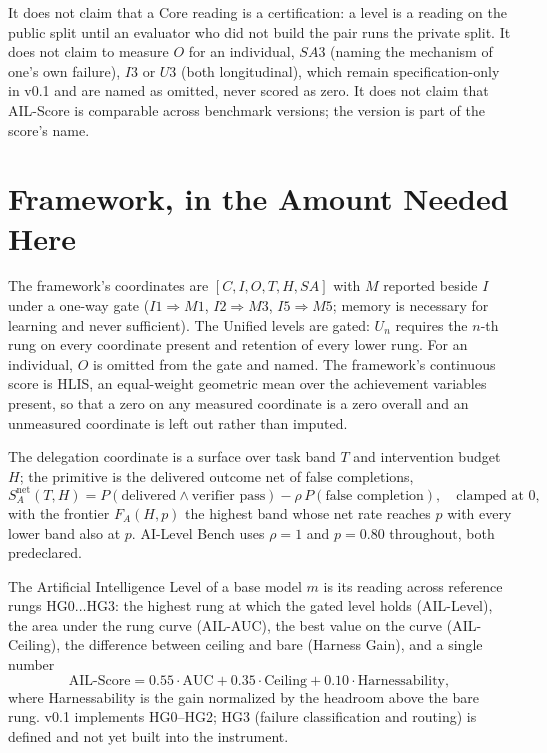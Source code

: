 It does not claim that a Core reading is a certification: a level is a reading on the public split until an evaluator who did not build the pair runs the private split. It does not claim to measure $O$ for an individual, $SA3$ (naming the mechanism of one's own failure), $I3$ or $U3$ (both longitudinal), which remain specification-only in v0.1 and are named as omitted, never scored as zero. It does not claim that AIL-Score is comparable across benchmark versions; the version is part of the score's name.

\section{Framework, in the Amount Needed Here}\label{sec:framework}

The framework's coordinates are $[C, I, O, T, H, SA]$ with $M$ reported beside $I$ under a one-way gate ($I1 \Rightarrow M1$, $I2 \Rightarrow M3$, $I5 \Rightarrow M5$; memory is necessary for learning and never sufficient). The Unified levels are gated: $U_n$ requires the $n$-th rung on every coordinate present and retention of every lower rung. For an individual, $O$ is omitted from the gate and named. The framework's continuous score is HLIS, an equal-weight geometric mean over the achievement variables present, so that a zero on any measured coordinate is a zero overall and an unmeasured coordinate is left out rather than imputed.

The delegation coordinate is a surface over task band $T$ and intervention budget $H$; the primitive is the delivered outcome net of false completions,
\[
S^{\text{net}}_A(T,H) = P(\text{delivered} \wedge \text{verifier pass}) - \rho\,P(\text{false completion}), \quad \text{clamped at } 0,
\]
with the frontier $F_A(H,p)$ the highest band whose net rate reaches $p$ with every lower band also at $p$. AI-Level Bench uses $\rho = 1$ and $p = 0.80$ throughout, both predeclared.

The Artificial Intelligence Level of a base model $m$ is its reading across reference rungs $\mathrm{HG}0 \ldots \mathrm{HG}3$: the highest rung at which the gated level holds (AIL-Level), the area under the rung curve (AIL-AUC), the best value on the curve (AIL-Ceiling), the difference between ceiling and bare (Harness Gain), and a single number
\[
\text{AIL-Score} = 0.55\cdot\text{AUC} + 0.35\cdot\text{Ceiling} + 0.10\cdot\text{Harnessability},
\]
where Harnessability is the gain normalized by the headroom above the bare rung. v0.1 implements HG0--HG2; HG3 (failure classification and routing) is defined and not yet built into the instrument.

